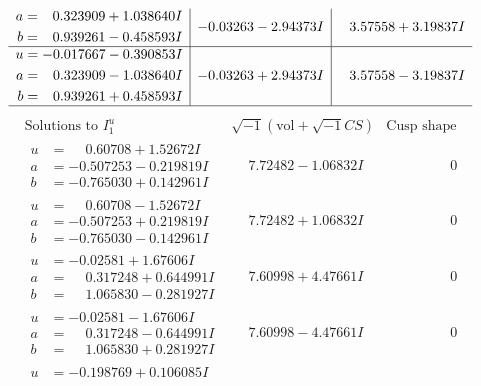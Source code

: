 \documentclass[1p]{elsarticle_modified}
\theoremstyle{definition}
\newcommand{\I}{\sqrt{-1}}
\begin{document}
$$\begin{array}{c|c|c}
\begin{aligned}
a &= \phantom{-}0.323909 + 1.038640 I \\
b &= \phantom{-}0.939261 - 0.458593 I\end{aligned}
 & -0.03263 - 2.94373 I & \phantom{-}3.57558 + 3.19837 I \\ \hline\begin{aligned}
u &= -0.017667 - 0.390853 I \\
a &= \phantom{-}0.323909 - 1.038640 I \\
b &= \phantom{-}0.939261 + 0.458593 I\end{aligned}
 & -0.03263 + 2.94373 I & \phantom{-}3.57558 - 3.19837 I\\
 \hline 
 \end{array}$$\newpage$$\begin{array}{c|c|c}  
\text{Solutions to }I^u_{1}& \I (\text{vol} + \sqrt{-1}CS) & \text{Cusp shape}\\
 \hline 
\begin{aligned}
u &= \phantom{-}0.60708 + 1.52672 I \\
a &= -0.507253 - 0.219819 I \\
b &= -0.765030 + 0.142961 I\end{aligned}
 & \phantom{-}7.72482 - 1.06832 I & \phantom{-0.000000 } 0 \\ \hline\begin{aligned}
u &= \phantom{-}0.60708 - 1.52672 I \\
a &= -0.507253 + 0.219819 I \\
b &= -0.765030 - 0.142961 I\end{aligned}
 & \phantom{-}7.72482 + 1.06832 I & \phantom{-0.000000 } 0 \\ \hline\begin{aligned}
u &= -0.02581 + 1.67606 I \\
a &= \phantom{-}0.317248 + 0.644991 I \\
b &= \phantom{-}1.065830 - 0.281927 I\end{aligned}
 & \phantom{-}7.60998 + 4.47661 I & \phantom{-0.000000 } 0 \\ \hline\begin{aligned}
u &= -0.02581 - 1.67606 I \\
a &= \phantom{-}0.317248 - 0.644991 I \\
b &= \phantom{-}1.065830 + 0.281927 I\end{aligned}
 & \phantom{-}7.60998 - 4.47661 I & \phantom{-0.000000 } 0 \\ \hline\begin{aligned}
u &= -0.198769 + 0.106085 I \\

\end{aligned}
\end{array}$$
\end{document}
